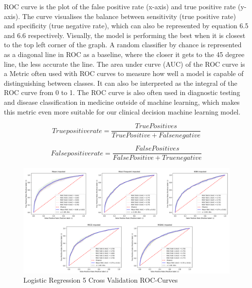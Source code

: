 \documentclass{l4proj}
\begin{document}
ROC curve is the plot of the false positive rate (x-axis) and true positive rate (y-axis). The curve visualises the balance between sensitivity (true positive rate) and specificity (true negative rate), which can also be represented by equation 6.5 and 6.6 respectively. Visually, the model is performing the best when it is closest to the top left corner of the graph. A random classifier by chance is represented as a diagonal line in ROC as a baseline, where the closer it gets to the 45 degree line, the less accurate the line. The area under curve (AUC) of the ROC curve is a Metric often used with ROC curves to measure how well a model is capable of distinguishing between classes. It can also be interpreted as the integral of the ROC curve from 0 to 1. The ROC curve is also often used in diagnostic testing and disease classification in medicine outside of machine learning, which makes this metric even more suitable for our clinical decision machine learning model. 

\begin{equation} \label{eq:5}
True positive rate = \frac{True Positives}{True Positive + False negative}
\end{equation}

\begin{equation} \label{eq:6}
False positive rate = \frac{False Positives}{False Positive + True negative}
\end{equation}

 \begin{figure}[!htb]
  \caption{Logistic Regression 5 Cross Validation ROC-Curves}
  \includegraphics[width=\textwidth]{dissertation/Latex/images/Classification Results/lg_roc.PNG}
\end{figure}
\end{document}
